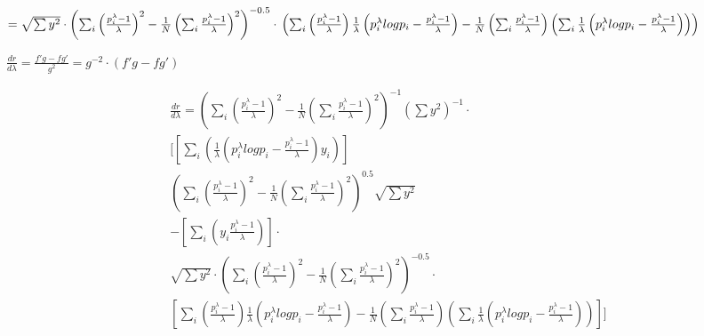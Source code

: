 \begin{math}
=
\sqrt{\sum{y^2}}\cdot
\left(\sum_i\left(\frac{p_i^{\lambda}-1}{\lambda}\right)^2-\frac{1}{N}\left(\sum_i \frac{p_i^{\lambda}-1}{\lambda}\right)^2  \right)^{-0.5} 
\cdot\\
\left(
\sum_i\left(\frac{p_i^{\lambda}-1}{\lambda} \right)\frac{1}{\lambda}\left(p_i^{\lambda}log{p_i}-\frac{p_i^{\lambda}-1}{\lambda}\right)
-\frac{1}{N}\left(\sum_i \frac{p_i^{\lambda}-1}{\lambda}\right) \left(\sum_i \frac{1}{\lambda}\left(p_i^{\lambda}log{p_i}-\frac{p_i^{\lambda}-1}{\lambda}\right) \right)
\right)
\end{math}

\begin{math}
\frac{dr}{d\lambda}=\frac{f'g-fg'}{g^2}=g^{-2}\cdot\left(f'g-fg'\right)
\end{math}

\begin{multline}
\frac{dr}{d\lambda}=
\left(\sum_i\left(\frac{p_i^{\lambda}-1}{\lambda}\right)^2-\frac{1}{N}\left(\sum_i \frac{p_i^{\lambda}-1}{\lambda}\right)^2  \right)^{-1} 
\left(\sum{y^2}\right)^{-1}\cdot  \\
[
\left[
\sum_i\left(\frac{1}{\lambda}\left(p_i^{\lambda}log{p_i}-\frac{p_i^{\lambda}-1}{\lambda}\right)y_i\right)
\right]  \\
\left(\sum_i\left(\frac{p_i^{\lambda}-1}{\lambda}\right)^2-\frac{1}{N}\left(\sum_i \frac{p_i^{\lambda}-1}{\lambda}\right)^2  \right)^{0.5} 
\sqrt{\sum{y^2}}  \\
-
\left[\sum_i \left(y_i\frac{p_i^{\lambda}-1}{\lambda}\right)\right]\cdot\\
\sqrt{\sum{y^2}}\cdot
\left(\sum_i\left(\frac{p_i^{\lambda}-1}{\lambda}\right)^2-\frac{1}{N}\left(\sum_i \frac{p_i^{\lambda}-1}{\lambda}\right)^2  \right)^{-0.5} 
\cdot\\
\left[
\sum_i\left(\frac{p_i^{\lambda}-1}{\lambda} \right)\frac{1}{\lambda}\left(p_i^{\lambda}log{p_i}-\frac{p_i^{\lambda}-1}{\lambda}\right)
-\frac{1}{N}\left(\sum_i \frac{p_i^{\lambda}-1}{\lambda}\right) \left(\sum_i \frac{1}{\lambda}\left(p_i^{\lambda}log{p_i}-\frac{p_i^{\lambda}-1}{\lambda}\right) \right)
\right]
]
\end{multline}


